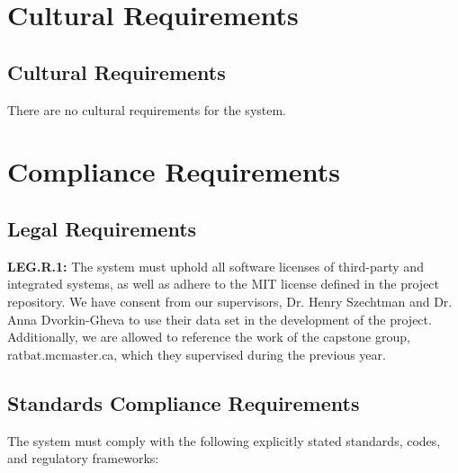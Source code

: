 \documentclass[12pt]{article}
\begin{document}
\section{Cultural Requirements}
\subsection{Cultural Requirements}
\par{There are no cultural requirements for the system.}

\section{Compliance Requirements}
\subsection{Legal Requirements}

\par{\textbf{LEG.R.1:}\label{req:leg.r.1} The system must uphold all software licenses of third-party and integrated systems, as well as adhere to the MIT license defined in the project repository. \newline \indent We have consent from our 
 supervisors, Dr. Henry Szechtman and Dr. Anna Dvorkin-Gheva to use their data set in the development of the project. Additionally, 
 we are allowed to reference the work of the capstone group, ratbat.mcmaster.ca, which they supervised during the previous year.}

\subsection{Standards Compliance Requirements}

The system must comply with the following explicitly stated standards, codes, and regulatory frameworks:
\end{document}
